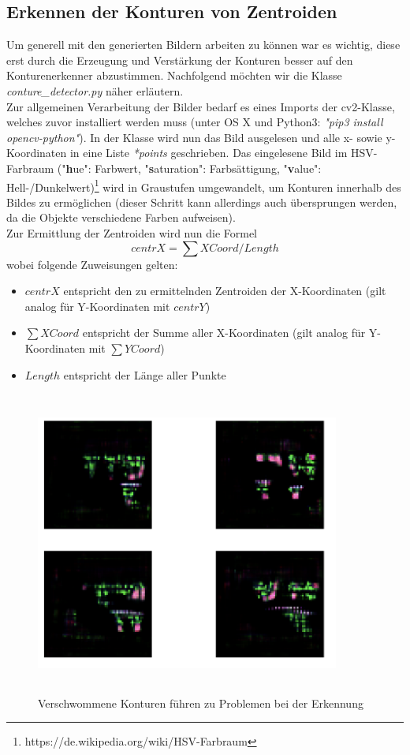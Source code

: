 \subsection{Erkennen der  Konturen von Zentroiden}
Um generell mit den generierten Bildern arbeiten zu können war es wichtig, diese erst durch die Erzeugung und Verstärkung der Konturen besser auf den Konturenerkenner abzustimmen. Nachfolgend möchten wir die Klasse \textit{conture\_detector.py} näher erläutern. \\
Zur allgemeinen Verarbeitung der Bilder bedarf es eines Imports der cv2-Klasse, welches zuvor installiert werden muss (unter OS X und Python3: \textit{"pip3 install opencv-python"}). In der Klasse wird nun das Bild ausgelesen und alle x- sowie y-Koordinaten in eine Liste \textit{*points} geschrieben. Das eingelesene Bild im HSV-Farbraum ("\textbf{h}ue": Farbwert, "\textbf{s}aturation": Farbsättigung, "\textbf{v}alue": Hell-/Dunkelwert)\footnote{https://de.wikipedia.org/wiki/HSV-Farbraum} wird in Graustufen umgewandelt, um Konturen innerhalb des Bildes zu ermöglichen (dieser Schritt kann allerdings auch übersprungen werden, da die Objekte verschiedene Farben aufweisen). \\ Zur Ermittlung der Zentroiden wird nun die Formel \[centrX = \sum XCoord / Length\] wobei folgende Zuweisungen gelten:
\begin{itemize}
	\item \(centrX\) entspricht den zu ermittelnden Zentroiden der X-Koordinaten (gilt analog für Y-Koordinaten mit \(centrY\))
	\item  \(\sum XCoord\) entspricht der Summe aller X-Koordinaten (gilt analog für Y-Koordinaten mit \(\sum YCoord\))
	\item  \(Length\) entspricht der Länge aller Punkte
\end{itemize}
\begin{figure}
	\centering
	\includegraphics[height=10cm, width=10cm]{img/blurry_attempts.png}
	\caption{Verschwommene Konturen führen zu Problemen bei der Erkennung}
\end{figure}
